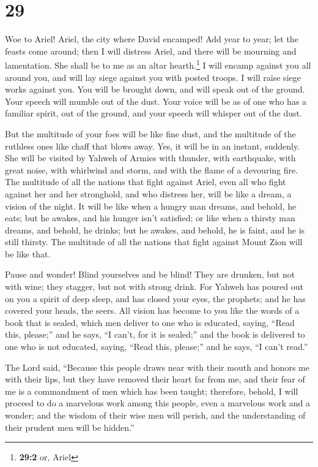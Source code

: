 \hypertarget{section-28}{%
\section{29}\label{section-28}}

 Woe to Ariel! Ariel, the city where David encamped! Add
year to year; let the feasts come around;  then I will
distress Ariel, and there will be mourning and lamentation. She shall be
to me as an altar hearth.\footnote{\textbf{29:2} or, Ariel}
 I will encamp against you all around you, and will lay
siege against you with posted troops. I will raise siege works against
you.  You will be brought down, and will speak out of the
ground. Your speech will mumble out of the dust. Your voice will be as
of one who has a familiar spirit, out of the ground, and your speech
will whisper out of the dust.

 But the multitude of your foes will be like fine dust,
and the multitude of the ruthless ones like chaff that blows away. Yes,
it will be in an instant, suddenly.  She will be visited
by Yahweh of Armies with thunder, with earthquake, with great noise,
with whirlwind and storm, and with the flame of a devouring fire.
 The multitude of all the nations that fight against
Ariel, even all who fight against her and her stronghold, and who
distress her, will be like a dream, a vision of the night.
 It will be like when a hungry man dreams, and behold, he
eats; but he awakes, and his hunger isn't satisfied; or like when a
thirsty man dreams, and behold, he drinks; but he awakes, and behold, he
is faint, and he is still thirsty. The multitude of all the nations that
fight against Mount Zion will be like that.

 Pause and wonder! Blind yourselves and be blind! They are
drunken, but not with wine; they stagger, but not with strong drink.
 For Yahweh has poured out on you a spirit of deep sleep,
and has closed your eyes, the prophets; and he has covered your heads,
the seers.  All vision has become to you like the words
of a book that is sealed, which men deliver to one who is educated,
saying, ``Read this, please;'' and he says, ``I can't, for it is
sealed;''  and the book is delivered to one who is not
educated, saying, ``Read this, please;'' and he says, ``I can't read.''

 The Lord said, ``Because this people draws near with
their mouth and honors me with their lips, but they have removed their
heart far from me, and their fear of me is a commandment of men which
has been taught;  therefore, behold, I will proceed to do
a marvelous work among this people, even a marvelous work and a wonder;
and the wisdom of their wise men will perish, and the understanding of
their prudent men will be hidden.''


